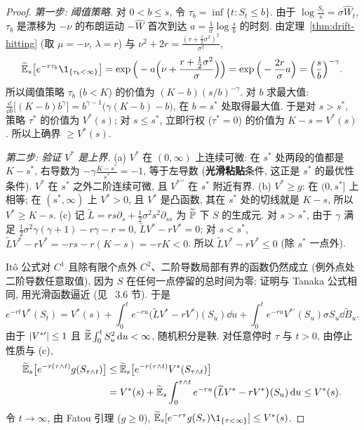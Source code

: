 \begin{proof}
\emph{第一步: 阈值策略.} 对 $0<b\le s$, 令 $\tau_b=\inf\{t:S_t\le b\}$. 由于 $\log\frac{S_t}{s}=\sigma\widehat{W}_t$, $\tau_b$ 是漂移为 $-\nu$ 的布朗运动 $-\widehat{W}$ 首次到达 $a=\frac{1}{\sigma}\log\frac{s}{b}$ 的时刻. 由定理~\ref{thm:drift-hitting} (取 $\mu=-\nu$, $\lambda=r$) 与 $\nu^2+2r=\frac{(r+\frac{1}{2}\sigma^2)^2}{\sigma^2}$,
\[
\widetilde{\E}_s\big[e^{-r\tau_b}\1_{\{\tau_b<\infty\}}\big]=\exp\Big(-a\Big(\nu+\frac{r+\frac{1}{2}\sigma^2}{\sigma}\Big)\Big)=\exp\Big(-\frac{2r}{\sigma}a\Big)=\Big(\frac{s}{b}\Big)^{-\gamma}.
\]
所以阈值策略 $\tau_b$ ($b<K$) 的价值为 $(K-b)(s/b)^{-\gamma}$. 对 $b$ 求最大值: $\frac{\dd}{\dd b}\big[(K-b)b^\gamma\big]=b^{\gamma-1}\big(\gamma(K-b)-b\big)$, 在 $b=s^*$ 处取得最大值. 于是对 $s>s^*$, 策略 $\tau^*$ 的价值为 $V^*(s)$; 对 $s\le s^*$, 立即行权 ($\tau^*=0$) 的价值为 $K-s=V^*(s)$. 所以上确界 $\ge V^*(s)$.

\emph{第二步: 验证 $V^*$ 是上界.} (a) $V^*$ 在 $(0,\infty)$ 上连续可微: 在 $s^*$ 处两段的值都是 $K-s^*$, 右导数为 $-\gamma\frac{K-s^*}{s^*}=-1$, 等于左导数 (\textbf{光滑粘贴}条件, 这正是 $s^*$ 的最优性条件). $V^*$ 在 $s^*$ 之外二阶连续可微, 且 $V^{*\prime\prime}$ 在 $s^*$ 附近有界. (b) $V^*\ge g$: 在 $(0,s^*]$ 上相等; 在 $(s^*,\infty)$ 上 $V^*>0$, 且 $V^*$ 是凸函数, 其在 $s^*$ 处的切线就是 $K-s$, 所以 $V^*\ge K-s$. (c) 记 $\widetilde{L}=rs\partial_s+\frac{1}{2}\sigma^2s^2\partial_{ss}$ 为 $\widetilde{\P}$ 下 $S$ 的生成元. 对 $s>s^*$, 由于 $\gamma$ 满足 $\frac{1}{2}\sigma^2\gamma(\gamma+1)-r\gamma-r=0$, $\widetilde{L}V^*-rV^*=0$; 对 $s<s^*$, $\widetilde{L}V^*-rV^*=-rs-r(K-s)=-rK<0$. 所以 $\widetilde{L}V^*-rV^*\le0$ (除 $s^*$ 一点外).

It\^o 公式对 $C^1$ 且除有限个点外 $C^2$、二阶导数局部有界的函数仍然成立 (例外点处二阶导数任意取值), 因为 $S$ 在任何一点停留的总时间为零; 证明与 Tanaka 公式相同, 用光滑函数逼近 (见~\cite{karatzas} 3.6 节). 于是
\[
e^{-rt}V^*(S_t)=V^*(s)+\int_0^te^{-ru}\big(\widetilde{L}V^*-rV^*\big)(S_u)\dd u+\int_0^te^{-ru}V^{*\prime}(S_u)\sigma S_u\dd\widetilde{B}_u.
\]
由于 $\abs{V^{*\prime}}\le1$ 且 $\widetilde{\E}\int_0^tS_u^2\dd u<\infty$, 随机积分是鞅. 对任意停时 $\tau$ 与 $t>0$, 由停止性质与 (c),
\begin{align*}
\widetilde{\E}_s\big[e^{-r(\tau\wedge t)}g(S_{\tau\wedge t})\big]&\le\widetilde{\E}_s\big[e^{-r(\tau\wedge t)}V^*(S_{\tau\wedge t})\big]\\
&=V^*(s)+\widetilde{\E}_s\int_0^{\tau\wedge t}e^{-ru}\big(\widetilde{L}V^*-rV^*\big)(S_u)\dd u\le V^*(s).
\end{align*}
令 $t\to\infty$, 由 Fatou 引理 ($g\ge0$), $\widetilde{\E}_s[e^{-r\tau}g(S_\tau)\1_{\{\tau<\infty\}}]\le V^*(s)$.
\end{proof}


